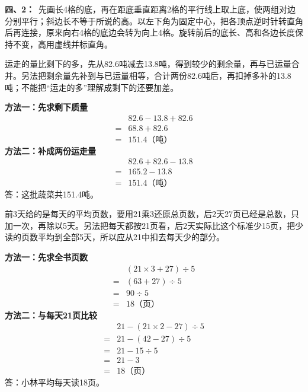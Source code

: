 \documentclass[multi=snippet,border=0pt]{standalone}
\newenvironment{snippet}[3]{\begin{minipage}{#1bp}\color{answerred}\fontsize{#2}{#3}\selectfont\raggedright}{\end{minipage}}
\begin{document}
\begin{snippet}{505}{11.5}{14}\textbf{四、2：}\ 先画长4格的底，再在距底垂直距离2格的平行线上取上底，使两组对边分别平行；斜边长不等于所说的高。以左下角为固定中心，把各顶点逆时针转直角后再连接，原来向右4格的底边会转为向上4格。旋转前后的底长、高和各边长度保持不变，高用虚线并标直角。\end{snippet}
\begin{snippet}{505}{11.5}{14}运走的量比剩下的多，先从82.6吨减去13.8吨，得到较少的剩余量，再与已运量合并。另法把剩余量先补到与已运量相等，合计两份82.6吨后，再扣掉多补的13.8吨；不能把“运走的多”理解成剩下的还要加差。\par \textbf{方法一：先求剩下质量}\[\begin{aligned} &82.6-13.8+82.6\\={}&68.8+82.6\\={}&151.4\text{（吨）}\end{aligned}\]\textbf{方法二：补成两份运走量}\[\begin{aligned} &82.6+82.6-13.8\\={}&165.2-13.8\\={}&151.4\text{（吨）}\end{aligned}\]答：这批蔬菜共151.4吨。\end{snippet}
\begin{snippet}{505}{11.5}{14}前3天给的是每天的平均页数，要用21乘3还原总页数，后2天27页已经是总数，只加一次，再除以5天。另法把每天都按21页看，后2天实际比这个标准少15页，把少读的页数平均到全部5天，所以应从21中扣去每天少的部分。\par \textbf{方法一：先求全书页数}\[\begin{aligned} &(21\times3+27)\div5\\={}&(63+27)\div5\\={}&90\div5\\={}&18\text{（页）}\end{aligned}\]\textbf{方法二：与每天21页比较}\[\begin{aligned} &21-(21\times2-27)\div5\\={}&21-(42-27)\div5\\={}&21-15\div5\\={}&21-3\\={}&18\text{（页）}\end{aligned}\]答：小林平均每天读18页。\end{snippet}
\end{document}
